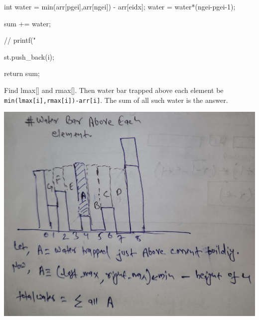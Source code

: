 \begin{solution}[Stack | O(n)]
\begin{code3}
{{{                    int water = min(arr[pgei],arr[ngei]) - arr[eidx];
                    water = water*(ngei-pgei-1);
                                 
                    sum += water;
                    
        //            printf("%
                }
                
                st.push_back(i);
            }
            
            return sum;
        }
    \end{code3}
\end{solution}

\begin{solution}[DP | O(n)]
    Find lmax[] and rmax[].
    Then water bar trapped above each element be\\
    \verb|min(lmax[i],rmax[i])-arr[i]|.
    The sum of all such water is the answer.

    \begin{marginfigure}
        \includegraphics[width=\marginparwidth]{resources/stack-rain-water-harverstin-2.jpg}
    \end{marginfigure}
\end{solution}
    
